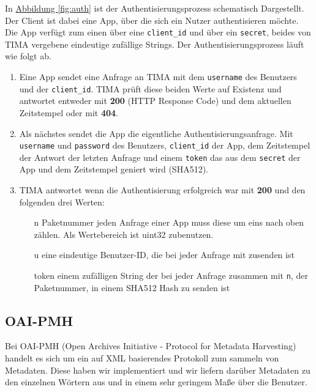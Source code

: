 In \hyperref[fig:auth]{Abbildung \ref*{fig:auth}} ist der Authentisierungsprozess schematisch Dargestellt. Der Client ist dabei eine App, über die sich ein Nutzer authentisieren möchte. Die App verfügt zum einen über eine \texttt{client\_id} und über ein \texttt{secret}, beides von TIMA vergebene eindeutige zufällige Strings. Der Authentisierungsprozess läuft wie folgt ab.
\begin{enumerate}
	\item Eine App sendet eine Anfrage an TIMA mit dem \texttt{username} des Benutzers und der \texttt{client\_id}. TIMA prüft diese beiden Werte auf Existenz und antwortet entweder mit \textbf{200} (HTTP Response Code) und dem aktuellen Zeitstempel oder mit \textbf{404}.
	\item Als nächstes sendet die App die eigentliche Authentisierungsanfrage. Mit \texttt{username} und \texttt{password} des Benutzers, \texttt{client\_id} der App, dem Zeitstempel der Antwort der letzten Anfrage und einem \texttt{token} das aus dem \texttt{secret} der App und dem Zeitstempel geniert wird (SHA512).
	\item TIMA antwortet wenn die Authentisierung erfolgreich war mit \textbf{200} und den folgenden drei Werten:
	\begin{itemize}
		\item[n] Paketnummer jeden Anfrage einer App muss diese um eins nach oben zählen. Als Wertebereich ist uint32 zubenutzen.
		\item[u] eine eindeutige Benutzer-ID, die bei jeder Anfrage mit zusenden ist
		\item[token] einem zufälligen String der bei jeder Anfrage zusammen mit \texttt{n}, der Paketnummer, in einem SHA512 Hash zu senden ist
	\end{itemize}
\end{enumerate}

\subsection{OAI-PMH}\label{sec:oai-pmh}
Bei OAI-PMH (Open Archives Initiative - Protocol for Metadata Harvesting)
handelt es sich um ein auf XML basierendes Protokoll zum sammeln von Metadaten.
Diese haben wir implementiert und wir liefern darüber Metadaten zu den
einzelnen Wörtern aus und in einem sehr geringem Maße über die Benutzer.
